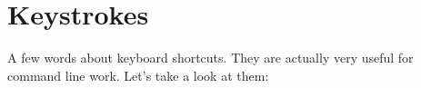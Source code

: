 \section*{Keystrokes}

A few words about keyboard shortcuts. They are actually very useful
for command line work. Let's take a look at them:

\begin{comment}
\noindent
\struct{erase}: erase single character: [Backspace] or [Ctrl]-[H], [Delete]
or [Ctrl]-[?]\\
\struct{werase}: erase word: [Ctrl]-[W]\\
\struct{kill}: erase complete line: [Ctrl]-[U]. This can be very useful when
you enter something wrong on an invisible line, such as when entering
a password.\\
\struct{rprnt}: renew the output: [Ctrl]-[R]\\
\struct{intr}: [Ctrl]-[C] or [Delete]. Kill current process. In fact,
these strange settings for the [Delete] key were used by some older UNIX.
And many were very confused when, when trying to delete incorrectly entered
characters, they killed the executable application.\\
\struct{quit}: [Ctrl]-[\textbackslash]. Kill the current process, but with
a memory dump. Such a dump can be used to analyze the internal state of programs
by the debugger. It can be created in the system automatically during a program
crash, if you have configured your system accordingly,
or like this~--- by [Ctrl]-[\textbackslash] keystroke to analyze state,
for example, a frozen program.\\
\struct{stop}: [Ctrl]-[S]. Stop a current process.\\
\struct{start}: [Ctrl]-[Q]. Continue a previously paused process. And if
the program seems to be frozen, first try pressing [Ctrl]-[Q] to resume
the process. Perhaps you accidentally pressed [Ctrl]-[S].\\
\struct{eof}: [Ctrl]-[D]. End of file mark. Can be used to complete input of
something.\\
\struct{susp}: [Ctrl]-[Z]. As you probably know, this is the EOF mark on Windows
systems. But on UNIX-like systems, it stops the current process and disconnects
it from the current terminal line. After that, the execution of this process
can be continued in the foreground or in the background.
\end{comment}

